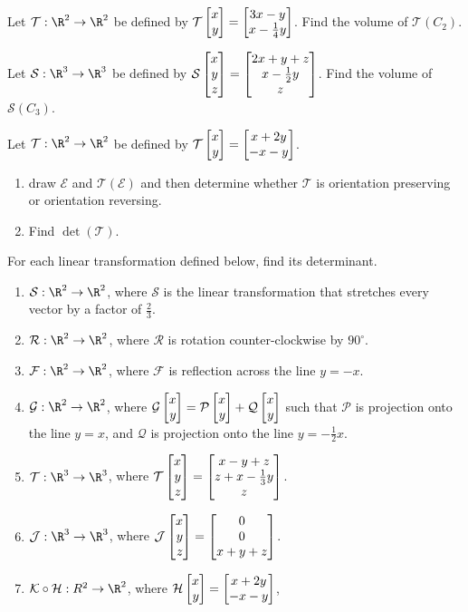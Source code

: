 \begin{exercises}
	\begin{problist}
		\prob Let $\mathcal T:\R^2\to\R^2$ be defined by $\mathcal T\mat{x\\y}=\matc{3x-y\\x-\tfrac{1}{4}y}$.
	Find the volume of $\mathcal T(C_2)$.
	
	    \prob Let $\mathcal S:\R^3\to\R^3$ be defined by $\mathcal S\mat{x\\y\\z}=\matc{2x+y+z\\x-\tfrac{1}{2}y\\z}$.
	Find the volume of $\mathcal S(C_3)$.
	   
	    \prob Let $\mathcal T:\R^2\to\R^2$ be defined by $\mathcal T\mat{x\\y}=\matc{x+2y\\-x-y}$.
	    \begin{enumerate}
			\item   draw $\mathcal{E}$ and $\mathcal{T}(\mathcal{E})$ and then determine whether $\mathcal{T}$ is orientation preserving or orientation reversing.
			\item  	Find $\det(\mathcal T)$.
        \end{enumerate}
        
        \prob For each linear transformation defined below, find its determinant.
        \begin{enumerate}
			\item   $\mathcal S:\R^2\to\R^2$, where $\mathcal S$ is the linear transformation that stretches every vector by a factor of $\tfrac{2}{3}$.
			\item   $\mathcal R:\R^2\to\R^2$, where $\mathcal R$ is rotation counter-clockwise by $90^{\circ}$.
			\item   $\mathcal F:\R^2\to\R^2$, where $\mathcal F$ is reflection across the line $y=-x$.
			\item   $\mathcal G:\R^2\to\R^2$, where $\mathcal G\mat{x\\y}=\mathcal{P}\mat{x\\y} + \mathcal{Q}\mat{x\\y}$ such that $\mathcal{P}$ is projection onto the line $y=x$, and $\mathcal{Q}$ is projection onto the line $y=-\tfrac{1}{2}
			x$.
			\item   $\mathcal T:\R^3\to\R^3$, where $\mathcal T\mat{x\\y\\z}=\matc{x-y+z\\z+x-\tfrac{1}{3}y\\z}$.
			\item   $\mathcal J:\R^3\to\R^3$, where $\mathcal J\mat{x\\y\\z}=\matc{0\\0\\x+y+z}$.
			\item   $\mathcal K\circ \mathcal H:R^2\to\R^2$, where $\mathcal H\mat{x\\y}=\matc{x+2y\\-x-y}$, 
			

\end{enumerate}
\end{problist}
\end{exercises}
